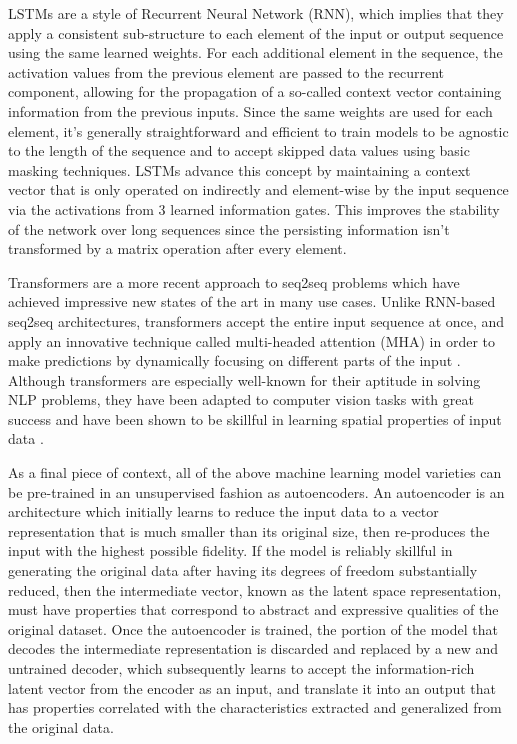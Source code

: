 \documentclass[12pt]{article}
\begin{document}
LSTMs are a style of Recurrent Neural Network (RNN), which implies that they apply a consistent sub-structure to each element of the input or output sequence using the same learned weights. For each additional element in the sequence, the activation values from the previous element are passed to the recurrent component, allowing for the propagation of a so-called context vector containing information from the previous inputs. Since the same weights are used for each element, it's generally straightforward and efficient to train models to be agnostic to the length of the sequence and to accept skipped data values using basic masking techniques. LSTMs advance this concept by maintaining a context vector that is only operated on indirectly and element-wise by the input sequence via the activations from 3 learned information gates. This improves the stability of the network over long sequences since the persisting information isn't transformed by a matrix operation after every element. \cite{hochreiter_long_1997}\cite{vennerod_long_2021}

Transformers are a more recent approach to seq2seq problems which have achieved impressive new states of the art in many use cases. Unlike RNN-based seq2seq architectures, transformers accept the entire input sequence at once, and apply an innovative technique called multi-headed attention (MHA) in order to make predictions by dynamically focusing on different parts of the input \cite{vaswani_attention_2017}. Although transformers are especially well-known for their aptitude in solving NLP problems, they have been adapted to computer vision tasks with great success and have been shown to be skillful in learning spatial properties of input data \cite{dosovitskiy_image_2021}\cite{he_masked_2021}.

As a final piece of context, all of the above machine learning model varieties can be pre-trained in an unsupervised fashion as autoencoders. An autoencoder is an architecture which initially learns to reduce the input data to a vector representation that is much smaller than its original size, then re-produces the input with the highest possible fidelity. If the model is reliably skillful in generating the original data after having its degrees of freedom substantially reduced, then the intermediate vector, known as the latent space representation, must have properties that correspond to abstract and expressive qualities of the original dataset. \cite{quade_sparse_2018}\cite{kashinath_physics-informed_2021}\cite{gao_bayesian_2022} Once the autoencoder is trained, the portion of the model that decodes the intermediate representation is discarded and replaced by a new and untrained decoder, which subsequently learns to accept the information-rich latent vector from the encoder as an input, and translate it into an output that has properties correlated with the characteristics extracted and generalized from the original data.
\end{document}
